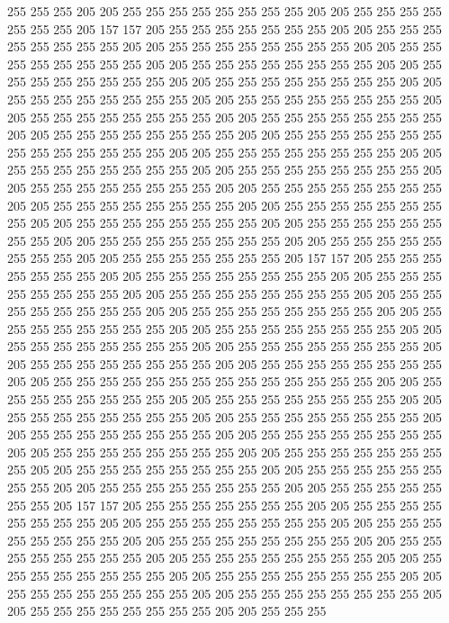 255 255 255 205 205 255 255 255 255 255 255 255 255 205 205 255 255 255 255 255
255 255 205 157 157 205 255 255 255 255 255 255 255 205 205 255 255 255 255 255
255 255 255 205 205 255 255 255 255 255 255 255 255 205 205 255 255 255 255 255
255 255 255 205 205 255 255 255 255 255 255 255 255 205 205 255 255 255 255 255
255 255 255 205 205 255 255 255 255 255 255 255 255 205 205 255 255 255 255 255
255 255 255 205 205 255 255 255 255 255 255 255 255 205 205 255 255 255 255 255
255 255 255 205 205 255 255 255 255 255 255 255 255 205 205 255 255 255 255 255
255 255 255 205 205 255 255 255 255 255 255 255 255 255 255 255 255 255 255 205
205 255 255 255 255 255 255 255 255 205 205 255 255 255 255 255 255 255 255 205
205 255 255 255 255 255 255 255 255 205 205 255 255 255 255 255 255 255 255 205
205 255 255 255 255 255 255 255 255 205 205 255 255 255 255 255 255 255 255 205
205 255 255 255 255 255 255 255 255 205 205 255 255 255 255 255 255 255 255 205
205 255 255 255 255 255 255 255 255 205 205 255 255 255 255 255 255 255 255 205
205 255 255 255 255 255 255 255 255 205 205 255 255 255 255 255 255 255 205 157
157 205 255 255 255 255 255 255 255 205 205 255 255 255 255 255 255 255 255 205
205 255 255 255 255 255 255 255 255 205 205 255 255 255 255 255 255 255 255 205
205 255 255 255 255 255 255 255 255 205 205 255 255 255 255 255 255 255 255 205
205 255 255 255 255 255 255 255 255 205 205 255 255 255 255 255 255 255 255 205
205 255 255 255 255 255 255 255 255 205 205 255 255 255 255 255 255 255 255 205
205 255 255 255 255 255 255 255 255 205 205 255 255 255 255 255 255 255 255 205
205 255 255 255 255 255 255 255 255 255 255 255 255 255 255 205 205 255 255 255
255 255 255 255 255 205 205 255 255 255 255 255 255 255 255 205 205 255 255 255
255 255 255 255 255 205 205 255 255 255 255 255 255 255 255 205 205 255 255 255
255 255 255 255 255 205 205 255 255 255 255 255 255 255 255 205 205 255 255 255
255 255 255 255 255 205 205 255 255 255 255 255 255 255 255 205 205 255 255 255
255 255 255 255 255 205 205 255 255 255 255 255 255 255 255 205 205 255 255 255
255 255 255 255 255 205 205 255 255 255 255 255 255 255 205 157 157 205 255 255
255 255 255 255 255 205 205 255 255 255 255 255 255 255 255 205 205 255 255 255
255 255 255 255 255 205 205 255 255 255 255 255 255 255 255 205 205 255 255 255
255 255 255 255 255 205 205 255 255 255 255 255 255 255 255 205 205 255 255 255
255 255 255 255 255 205 205 255 255 255 255 255 255 255 255 205 205 255 255 255
255 255 255 255 255 205 205 255 255 255 255 255 255 255 255 205 205 255 255 255
255 255 255 255 255 205 205 255 255 255 255 255 255 255 255 205 205 255 255 255
